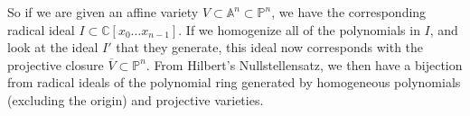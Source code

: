 \documentclass[psamsfonts]{amsart}
\theoremstyle{definition}
\theoremstyle{remark}
\newcommand{\C}{\mathbb{C}}
\newcommand{\A}{\mathbb{A}}
\newcommand{\p}{\mathbb{P}}
\begin{document}
So if we are given an affine variety $V \subset \A^n \subset \p^n$, we have the corresponding radical ideal $I \subset \C[x_0 \dots x_{n-1}]$. If we homogenize all of the polynomials in $I$, and look at the ideal $I'$ that they generate, this ideal now corresponds with the projective closure $\overline{V} \subset \p^n$. From Hilbert's Nullstellensatz, we then have a bijection from radical ideals of the polynomial ring generated by homogeneous polynomials (excluding the origin) and projective varieties.   
\end{document}
